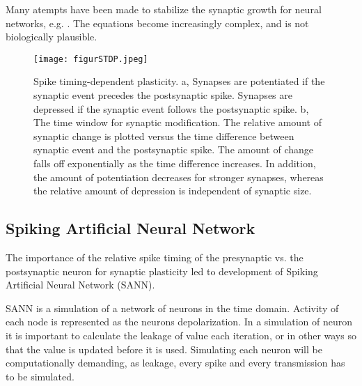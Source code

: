	Many atempts have been made to stabilize the synaptic growth for neural networks, e.g. \cite{hebbUstabilt}. %
	The equations become increasingly complex, and is not biologically plausible.

\begin{figure}[htb!p]
	\centering
	\texttt{[image: figurSTDP.jpeg]}
	\caption{Spike timing-dependent plasticity. a, Synapses are potentiated if the synaptic event precedes the postsynaptic spike. Synapses are depressed if the synaptic event follows the postsynaptic spike. b, The time window for synaptic modification. The relative amount of synaptic change is plotted versus the time difference between synaptic event and the postsynaptic spike. The amount of change falls off exponentially as the time difference increases. In addition, the amount of potentiation decreases for stronger synapses, whereas the relative amount of depression is independent of synaptic size.}
	\cite{stableHebbVedSTDP}
\end{figure}

\subsection{Spiking Artificial Neural Network}
\label{ssecSpikinANN}
The importance of the relative spike timing of the presynaptic vs. the postsynaptic neuron for synaptic plasticity led to development of Spiking Artificial Neural Network (SANN). 

SANN is a simulation of a network of neurons in the time domain. Activity of each node is represented as the neurons depolarization. 
In a simulation of neuron it is important to calculate the leakage of value each iteration, or in other ways so that the value is updated before it is used. 
Simulating each neuron will be computationally demanding, as leakage, every spike and every transmission has to be simulated. %

